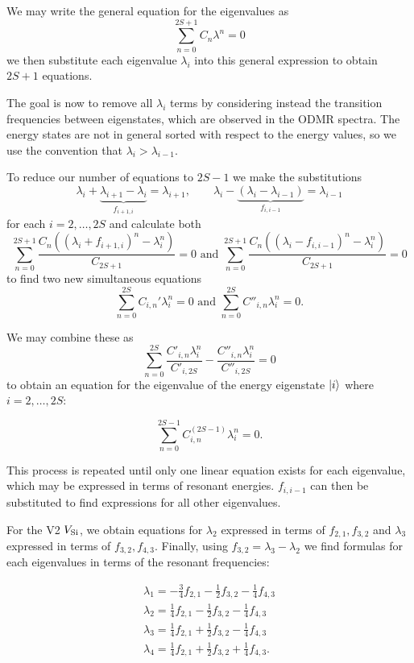 We may write the general equation for the eigenvalues as 
\begin{equation}
    \sum_{n=0}^{2S+1} C_n \lambda^n = 0
    \label{eq:}
\end{equation}
we then substitute each eigenvalue $\lambda_i$ into this general expression to obtain $2S + 1$ equations. 

The goal is now to remove all $\lambda_i$ terms by considering instead the transition frequencies between eigenstates, which are observed in the ODMR spectra. The energy states are not in general sorted with respect to the energy values, so we use the convention that $\lambda_i > \lambda_{i-1}$. 

To reduce our number of equations to $2S-1$ we make the substitutions  
$$\lambda_i + \underbrace{\lambda_{i+1} - \lambda_{i}}_{f_{i+1, i}} = \lambda_{i+1},
\qquad\lambda_i - \underbrace{(\lambda_{i} - \lambda_{i-1})}_{f_{i, i-1}} = \lambda_{i-1}$$
for each $i = 2, \dots, 2S$ and calculate both 
$$\sum_{n=0}^{2S +1} \frac{C_n \left((\lambda_i + f_{i+1, i})^n - \lambda_i^n\right)}{C_{2S+1}} = 0\text{ and } \sum_{n=0}^{2S +1}\frac{C_n \left((\lambda_i - f_{i, i-1})^n - \lambda_i^n\right)}{C_{2S + 1}} = 0$$
to find two new simultaneous equations 
$$\sum_{n=0}^{2S} C_{i,n}' \lambda_i^n = 0 \text{ and } \sum_{n=0}^{2S} C''_{i,n}\lambda_i^n = 0.$$

We may combine these as 
$$\sum_{n=0}^{2S} \frac{C'_{i,n}\lambda_i^n}{C'_{i,2S}}-\frac{C''_{i,n} \lambda_i^n}{C''_{i, 2S}} = 0$$
to obtain an equation for the eigenvalue of the energy eigenstate $\ket{i}$ where $i = 2, \dots, 2S$: 

\begin{equation}
    \sum_{n=0}^{2S -1} C_{i,n}^{(2S-1)} \lambda_i^n = 0.
    \label{eq:refmenowpls}
\end{equation}

This process is repeated until only one linear equation exists for each eigenvalue, which may be expressed in terms of resonant energies. $f_{i, i-1}$ can then be substituted to find expressions for all other eigenvalues. 

For the V2 $V_{\ce{Si}}$, we obtain equations for $\lambda_2$ expressed in terms of $f_{2,1}, f_{3,2}$ and $\lambda_3$ expressed in terms of $f_{3,2}, f_{4,3}$. Finally, using $f_{3,2} = \lambda_3 - \lambda_2$ we find formulas for each eigenvalues in terms of the resonant frequencies: 

\begin{eqnarray}
    \lambda_1 = -\frac{3}{4}f_{2,1} - \frac{1}{2} f_{3,2} - \frac{1}{4} f_{4,3}\\ 
    \lambda_2 = \frac{1}{4}f_{2,1} - \frac{1}{2}f_{3,2} - \frac{1}{4} f_{4,3} \\ 
    \lambda_3 = \frac{1}{4}f_{2,1} + \frac{1}{2}f_{3,2} - \frac{1}{4} f_{4,3} \\ 
    \lambda_4 = \frac{1}{4}f_{2,1} + \frac{1}{2}f_{3,2} + \frac{1}{4} f_{4,3}.
\end{eqnarray}

